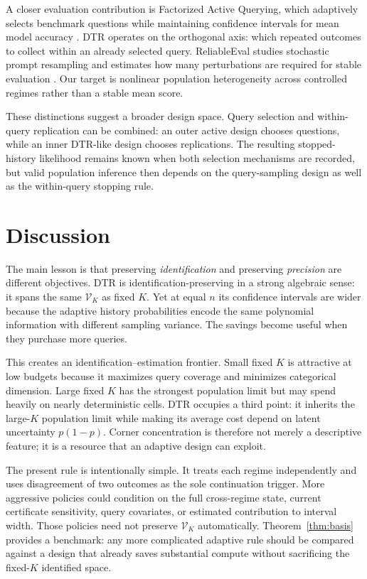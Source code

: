 \documentclass[11pt]{article}
\theoremstyle{remark}
\newcommand{\calV}{\mathcal{V}}
\begin{document}
A closer evaluation contribution is Factorized Active Querying, which adaptively selects benchmark questions while maintaining confidence intervals for mean model accuracy \citep{Wu2026FAQ}. DTR operates on the orthogonal axis: which repeated outcomes to collect within an already selected query. ReliableEval studies stochastic prompt resampling and estimates how many perturbations are required for stable evaluation \citep{Lior2025ReliableEval}. Our target is nonlinear population heterogeneity across controlled regimes rather than a stable mean score.

These distinctions suggest a broader design space. Query selection and within-query replication can be combined: an outer active design chooses questions, while an inner DTR-like design chooses replications. The resulting stopped-history likelihood remains known when both selection mechanisms are recorded, but valid population inference then depends on the query-sampling design as well as the within-query stopping rule.

\section{Discussion}

The main lesson is that preserving \emph{identification} and preserving \emph{precision} are different objectives. DTR is identification-preserving in a strong algebraic sense: it spans the same $\calV_K$ as fixed $K$. Yet at equal $n$ its confidence intervals are wider because the adaptive history probabilities encode the same polynomial information with different sampling variance. The savings become useful when they purchase more queries.

This creates an identification--estimation frontier. Small fixed $K$ is attractive at low budgets because it maximizes query coverage and minimizes categorical dimension. Large fixed $K$ has the strongest population limit but may spend heavily on nearly deterministic cells. DTR occupies a third point: it inherits the large-$K$ population limit while making its average cost depend on latent uncertainty $p(1-p)$. Corner concentration is therefore not merely a descriptive feature; it is a resource that an adaptive design can exploit.

The present rule is intentionally simple. It treats each regime independently and uses disagreement of two outcomes as the sole continuation trigger. More aggressive policies could condition on the full cross-regime state, current certificate sensitivity, query covariates, or estimated contribution to interval width. Those policies need not preserve $\calV_K$ automatically. Theorem~\ref{thm:basis} provides a benchmark: any more complicated adaptive rule should be compared against a design that already saves substantial compute without sacrificing the fixed-$K$ identified space.
\end{document}
